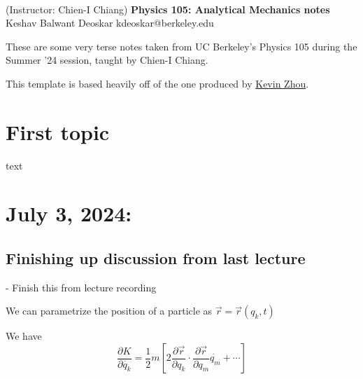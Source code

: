 \documentclass[11pt]{article}
\begin{document}
\thispagestyle{empty}
\bigskip \
\vspace{0.1cm}

\begin{center}
{\fontsize{22}{22} \selectfont (Instructor: Chien-I Chiang)}
\vskip 16pt
{\fontsize{36}{36} \selectfont \bf \sffamily Physics 105: Analytical Mechanics notes}
\vskip 24pt
{\fontsize{18}{18} \selectfont \rmfamily Keshav Balwant Deoskar} 
\vskip 6pt
{\fontsize{14}{14} \selectfont \ttfamily kdeoskar@berkeley.edu} 
\vskip 24pt
\end{center}



These are some very terse notes taken from UC Berkeley's Physics 105 during the Summer '24 session, taught by Chien-I Chiang.

\vskip 0.5cm
This template is based heavily off of the one produced by \href{https://knzhou.github.io/}{Kevin Zhou}.

\tableofcontents 


\newpage
\section{First topic}

\vskip 0.5cm
text


\newpage
\section{July 3, 2024:}

\subsection{Finishing up discussion from last lecture}
- Finish this from lecture recording

\vskip 0.5cm
We can parametrize the position of a particle as $\vec{r} = \vec{r}(q_k, t)$

We have 
\[ \frac{\partial K}{\partial \dot{q_{k}}} = \frac{1}{2}m \left[ 2 \frac{\partial \vec{r}}{\partial q_k} \cdot \frac{\partial \vec{r}}{\partial q_{m}} \dot{q_{m}} + \cdots \right] \]
\end{document}
